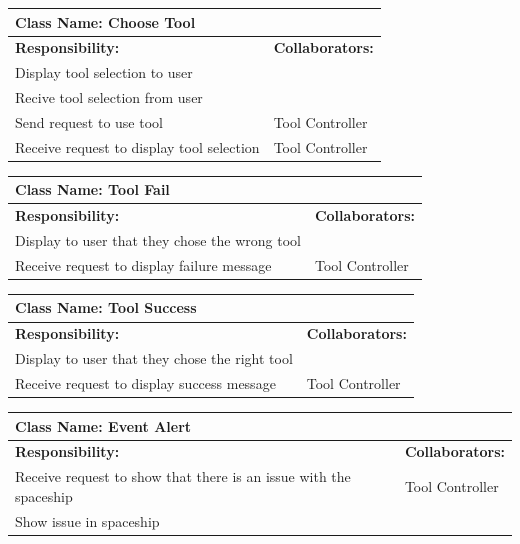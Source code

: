 \documentclass[12pt, titlepage]{article}
\begin{document}
\begin{enumerate}[a)]
	\begin{table}[H]
		\centering
		\begin{tabular}{|p{10cm}|p{5cm}|}
		\hline 
		 \multicolumn{2}{|l|}{\textbf{Class Name: Choose Tool}} \\
		\hline
		\textbf{Responsibility:} & \textbf{Collaborators:} \\
		\hline
		 Display tool selection to user& \\
		\hline
		 Recive tool selection from user& \\
		\hline
		 Send request to use tool & Tool Controller\\
		\hline
		 Receive request to display tool selection & Tool Controller \\
		\hline
		\end{tabular}
	\end{table}
	
	\begin{table}[H]
		\centering
		\begin{tabular}{|p{10cm}|p{5cm}|}
		\hline 
		 \multicolumn{2}{|l|}{\textbf{Class Name: Tool Fail}} \\
		\hline
		\textbf{Responsibility:} & \textbf{Collaborators:} \\
		\hline
		 Display to user that they chose the wrong tool & \\
		\hline
		Receive request to display failure message & Tool Controller \\
		\hline
		\end{tabular}
	\end{table}

	\begin{table}[H]
		\centering
		\begin{tabular}{|p{10cm}|p{5cm}|}
		\hline 
		 \multicolumn{2}{|l|}{\textbf{Class Name: Tool Success}} \\
		\hline
		\textbf{Responsibility:} & \textbf{Collaborators:} \\
		\hline
		 Display to user that they chose the right tool & \\
		\hline
		Receive request to display success message & Tool Controller \\
		\hline
		\end{tabular}
	\end{table}

	\begin{table}[H]
		\centering
		\begin{tabular}{|p{10cm}|p{5cm}|}
		\hline 
		 \multicolumn{2}{|l|}{\textbf{Class Name: Event Alert}} \\
		\hline
		\textbf{Responsibility:} & \textbf{Collaborators:} \\
		\hline
		 Receive request to show that there is an issue with the spaceship & Tool Controller\\
		\hline
		Show issue in spaceship & \\
		\hline
		\end{tabular}
	\end{table}


\end{enumerate}
\end{document}
